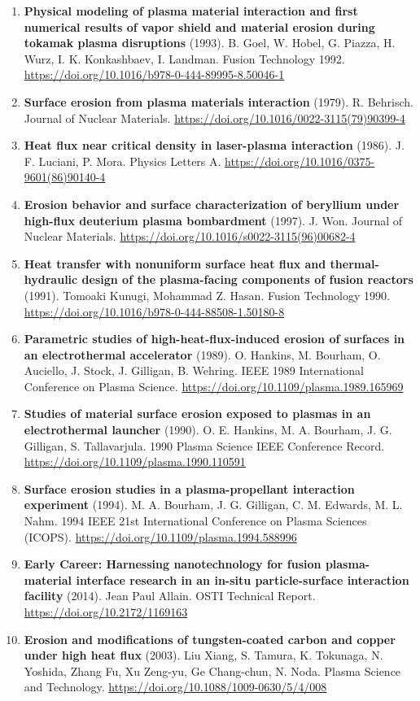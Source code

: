 \documentclass[11pt,a4paper]{article}
\begin{document}
\begin{enumerate}[leftmargin=1.4em]
\item \textbf{Physical modeling of plasma material interaction and first numerical results of vapor shield and material erosion during tokamak plasma disruptions} (1993). B. Goel, W. Hobel, G. Piazza, H. Wurz, I. K. Konkashbaev, I. Landman. Fusion Technology 1992. \url{https://doi.org/10.1016/b978-0-444-89995-8.50046-1}
\item \textbf{Surface erosion from plasma materials interaction} (1979). R. Behrisch. Journal of Nuclear Materials. \url{https://doi.org/10.1016/0022-3115(79)90399-4}
\item \textbf{Heat flux near critical density in laser-plasma interaction} (1986). J. F. Luciani, P. Mora. Physics Letters A. \url{https://doi.org/10.1016/0375-9601(86)90140-4}
\item \textbf{Erosion behavior and surface characterization of beryllium under high-flux deuterium plasma bombardment} (1997). J. Won. Journal of Nuclear Materials. \url{https://doi.org/10.1016/s0022-3115(96)00682-4}
\item \textbf{Heat transfer with nonuniform surface heat flux and thermal-hydraulic design of the plasma-facing components of fusion reactors} (1991). Tomoaki Kunugi, Mohammad Z. Hasan. Fusion Technology 1990. \url{https://doi.org/10.1016/b978-0-444-88508-1.50180-8}
\item \textbf{Parametric studies of high-heat-flux-induced erosion of surfaces in an electrothermal accelerator} (1989). O. Hankins, M. Bourham, O. Auciello, J. Stock, J. Gilligan, B. Wehring. IEEE 1989 International Conference on Plasma Science. \url{https://doi.org/10.1109/plasma.1989.165969}
\item \textbf{Studies of material surface erosion exposed to plasmas in an electrothermal launcher} (1990). O. E. Hankins, M. A. Bourham, J. G. Gilligan, S. Tallavarjula. 1990 Plasma Science IEEE Conference Record. \url{https://doi.org/10.1109/plasma.1990.110591}
\item \textbf{Surface erosion studies in a plasma-propellant interaction experiment} (1994). M. A. Bourham, J. G. Gilligan, C. M. Edwards, M. L. Nahm. 1994 IEEE 21st International Conference on Plasma Sciences (ICOPS). \url{https://doi.org/10.1109/plasma.1994.588996}
\item \textbf{Early Career: Harnessing nanotechnology for fusion plasma-material interface research in an in-situ particle-surface interaction facility} (2014). Jean Paul Allain. OSTI Technical Report. \url{https://doi.org/10.2172/1169163}
\item \textbf{Erosion and modifications of tungsten-coated carbon and copper under high heat flux} (2003). Liu Xiang, S. Tamura, K. Tokunaga, N. Yoshida, Zhang Fu, Xu Zeng-yu, Ge Chang-chun, N. Noda. Plasma Science and Technology. \url{https://doi.org/10.1088/1009-0630/5/4/008}

\end{enumerate}
\end{document}
